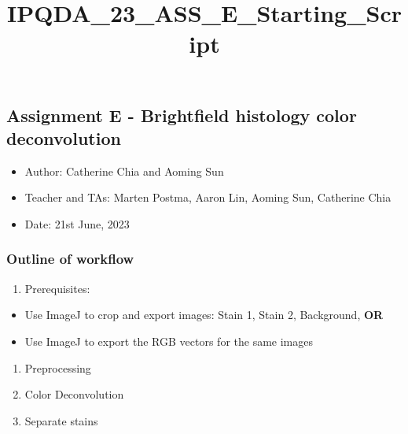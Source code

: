 \documentclass[11pt]{article}
\title{IPQDA\_23\_ASS\_E\_Starting\_Script}
\providecommand{\tightlist}{%
      \setlength{\itemsep}{0pt}\setlength{\parskip}{0pt}}
\begin{document}
    
    \maketitle
    
    

    
    \hypertarget{assignment-e---brightfield-histology-color-deconvolution}{%
\subsection{Assignment E - Brightfield histology color
deconvolution}\label{assignment-e---brightfield-histology-color-deconvolution}}

\begin{itemize}
\tightlist
\item
  Author: Catherine Chia and Aoming Sun
\item
  Teacher and TAs: Marten Postma, Aaron Lin, Aoming Sun, Catherine Chia
\item
  Date: 21st June, 2023
\end{itemize}

    \hypertarget{outline-of-workflow}{%
\subsubsection{Outline of workflow}\label{outline-of-workflow}}

\begin{enumerate}
\def\labelenumi{\arabic{enumi}.}
\tightlist
\item
  Prerequisites:
\end{enumerate}

\begin{itemize}
\tightlist
\item
  Use ImageJ to crop and export images: Stain 1, Stain 2, Background,
  \textbf{OR}
\item
  Use ImageJ to export the RGB vectors for the same images
\end{itemize}

\begin{enumerate}
\def\labelenumi{\arabic{enumi}.}
\setcounter{enumi}{1}
\item
  Preprocessing
\item
  Color Deconvolution
\item
  Separate stains
\end{enumerate}
\end{document}
